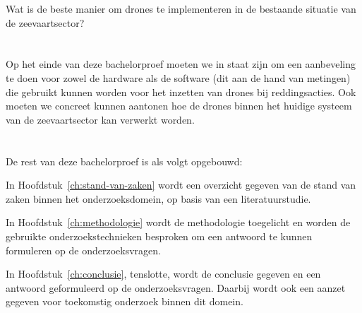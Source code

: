Wat is de beste manier om drones te implementeren in de bestaande situatie van de zeevaartsector?

\section{}
\label{sec:onderzoeksdoelstelling}

Op het einde van deze bachelorproef moeten we in staat zijn om een aanbeveling te doen voor zowel de hardware als de software (dit aan de hand van metingen) die gebruikt kunnen worden voor het inzetten van drones bij reddingsacties. Ook moeten we concreet kunnen aantonen hoe de drones binnen het huidige systeem van de zeevaartsector kan verwerkt worden.

\section{}
\label{sec:opzet-bachelorproef}


De rest van deze bachelorproef is als volgt opgebouwd:

In Hoofdstuk~\ref{ch:stand-van-zaken} wordt een overzicht gegeven van de stand van zaken binnen het onderzoeksdomein, op basis van een literatuurstudie.

In Hoofdstuk~\ref{ch:methodologie} wordt de methodologie toegelicht en worden de gebruikte onderzoekstechnieken besproken om een antwoord te kunnen formuleren op de onderzoeksvragen.


In Hoofdstuk~\ref{ch:conclusie}, tenslotte, wordt de conclusie gegeven en een antwoord geformuleerd op de onderzoeksvragen. Daarbij wordt ook een aanzet gegeven voor toekomstig onderzoek binnen dit domein.